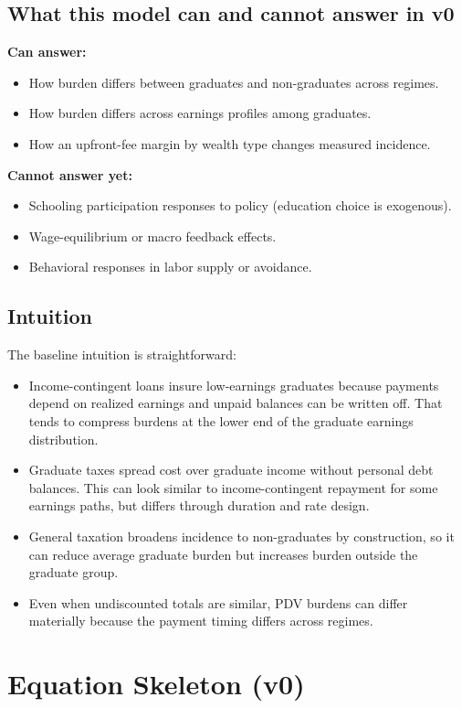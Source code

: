 \documentclass[11pt]{article}
\begin{document}
\subsection{What this model can and cannot answer in v0}
\textbf{Can answer:}
\begin{itemize}
\item How burden differs between graduates and non-graduates across regimes.
\item How burden differs across earnings profiles among graduates.
\item How an upfront-fee margin by wealth type changes measured incidence.
\end{itemize}
\textbf{Cannot answer yet:}
\begin{itemize}
\item Schooling participation responses to policy (education choice is exogenous).
\item Wage-equilibrium or macro feedback effects.
\item Behavioral responses in labor supply or avoidance.
\end{itemize}

\subsection{Intuition}
The baseline intuition is straightforward:
\begin{itemize}
\item Income-contingent loans insure low-earnings graduates because payments depend on realized earnings and unpaid balances can be written off. That tends to compress burdens at the lower end of the graduate earnings distribution.
\item Graduate taxes spread cost over graduate income without personal debt balances. This can look similar to income-contingent repayment for some earnings paths, but differs through duration and rate design.
\item General taxation broadens incidence to non-graduates by construction, so it can reduce average graduate burden but increases burden outside the graduate group.
\item Even when undiscounted totals are similar, PDV burdens can differ materially because the payment timing differs across regimes.
\end{itemize}

\section{Equation Skeleton (v0)}
\end{document}

